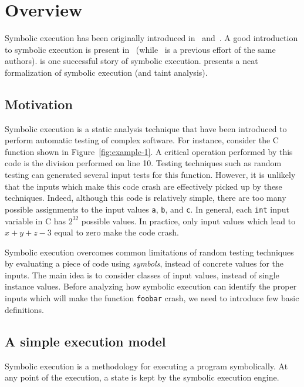 
\section{Overview}

Symbolic execution has been originally introduced in~\cite{K-CACM76} and~\cite{H-TSE77}. A good introduction to symbolic execution is present in~\cite{KLEE-OSDI08} (while~\cite{EXE-CCS06} is a previous effort of the same authors). \cite{SAGE-NDSS08} is one successful story of symbolic execution. \cite{SAB-SP10} presents a neat formalization of symbolic execution (and taint analysis).

\subsection{Motivation}

Symbolic execution is a static analysis technique that have been introduced to perform automatic testing of complex software. For instance, consider the C function shown in Figure~\ref{fig:example-1}. A critical operation performed by this code is the division performed on line 10. Testing techniques such as random testing can generated several input tests for this function. However, it is unlikely that the inputs which make this code crash are effectively picked up by these techniques. Indeed, although this code is relatively simple, there are too many possible assignments to the input values {\tt a}, {\tt b}, and {\tt c}. In general, each {\tt int} input variable in C has $2^{32}$ possible values. In practice, only input values which lead to $x + y + z - 3$ equal to zero make the code crash.

Symbolic execution overcomes common limitations of random testing techniques by evaluating a piece of code using {\em symbols}, instead of concrete values for the inputs. The main idea is to consider classes of input values, instead of single instance values. Before analyzing how symbolic execution can identify the proper inputs which will make the function {\tt foobar} crash, we need to introduce few basic definitions.

\subsection{A simple execution model}
\label{simple-execution-model}

Symbolic execution is a methodology for executing a program symbolically. At any point of the execution, a state is kept by the symbolic execution engine.

